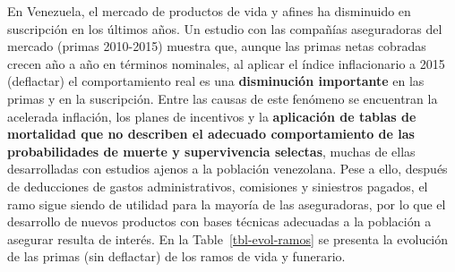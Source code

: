 \documentclass[
  11pt,
  a4paper,
]{article}
\begin{document}
En Venezuela, el mercado de productos de vida y afines ha disminuido en
suscripción en los últimos años. Un estudio con las compañías
aseguradoras del mercado (primas 2010-2015) muestra que, aunque las
primas netas cobradas crecen año a año en términos nominales, al aplicar
el índice inflacionario a 2015 (deflactar) el comportamiento real es una
\textbf{disminución importante} en las primas y en la suscripción. Entre
las causas de este fenómeno se encuentran la acelerada inflación, los
planes de incentivos y la \textbf{aplicación de tablas de mortalidad que
no describen el adecuado comportamiento de las probabilidades de muerte
y supervivencia selectas}, muchas de ellas desarrolladas con estudios
ajenos a la población venezolana. Pese a ello, después de deducciones de
gastos administrativos, comisiones y siniestros pagados, el ramo sigue
siendo de utilidad para la mayoría de las aseguradoras, por lo que el
desarrollo de nuevos productos con bases técnicas adecuadas a la
población a asegurar resulta de interés. En la
Table~\ref{tbl-evol-ramos} se presenta la evolución de las primas (sin
deflactar) de los ramos de vida y funerario.
\end{document}
